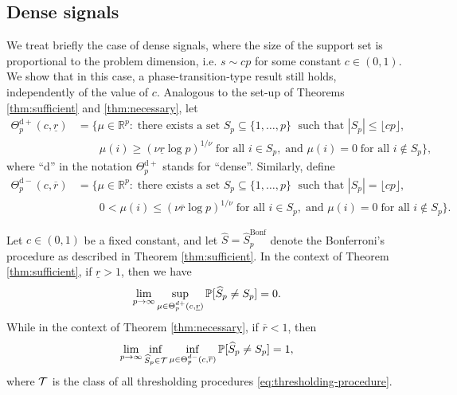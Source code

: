 \subsection{Dense signals} 
\label{subsec:dense-signals}

We treat briefly the case of dense signals,
where the size of the support set is proportional to the problem dimension, i.e. $s\sim cp$ for some constant $c\in(0,1)$.
We show that in this case, a phase-transition-type result still holds, independently of the value of $c$. 
Analogous to the set-up of Theorems \ref{thm:sufficient} and \ref{thm:necessary}, let
\begin{align} \label{eq:minimax-signal-config-over-dense}
    \Theta_p^{\mathrm{d}+}(c, \underline{r}) &= \{\mu\in\mathbb{R}^p:\;\text{there exists a set }S_p\subseteq\{1,\ldots,p\}\;\text{ such that }|S_p|\le\lfloor cp\rfloor, \nonumber \\
    &\quad\quad\mu(i)\ge (\nu\underline{r}\log{p})^{1/\nu}\;\text{for all }i\in S_p,\;\text{and }\mu(i)=0\;\text{for all }i\not\in S_p\},
\end{align}
where ``$\mathrm{d}$'' in the notation $\Theta_p^{\mathrm{d}+}$ stands for ``dense''. 
Similarly, define
\begin{align} \label{eq:minimax-signal-config-under-dense}
    \Theta_p^{\mathrm{d}-}(c, \overline{r}) &= \{\mu\in\mathbb{R}^p:\;\text{there exists a set }S_p\subseteq\{1,\ldots,p\}\;\text{ such that }|S_p|=\lfloor cp\rfloor, \nonumber \\
    &\quad\quad0<\mu(i)\le (\nu\overline{r}\log{p})^{1/\nu}\;\text{for all }i\in S_p,\;\text{and }\mu(i)=0\;\text{for all }i\not\in S_p\}.
\end{align}

\begin{theorem} \label{thm:dense-signals}
Let $c\in(0,1)$ be a fixed constant, and let $\widehat{S} = \widehat{S}^{\text{Bonf}}_p$ denote the Bonferroni's procedure as described in Theorem \ref{thm:sufficient}.
In the context of Theorem \ref{thm:sufficient}, if $\underline{r} > 1$, then we have
\begin{equation} \label{eq:exact-supporot-recovery-dense}
    \lim_{p\to\infty}\sup_{\mu\in\Theta_p^{d+}(c, \underline{r})} \P[\widehat{S}_p \neq S_p] = 0.
\end{equation}
While in the context of Theorem \ref{thm:necessary}, if $\overline{r} < 1$, then
\begin{equation} \label{eq:classification-impossible-dependent-dense}
    \lim_{p\to\infty} \inf_{\widehat{S}_p\in{\cal T}} \inf_{\mu\in{\Theta_p^{d-}(c, \overline{r})}} \P[\widehat{S}_p \neq S_p] = 1,
\end{equation}
where ${\cal T}$ is the class of all thresholding procedures \eqref{eq:thresholding-procedure}.
\end{theorem}

